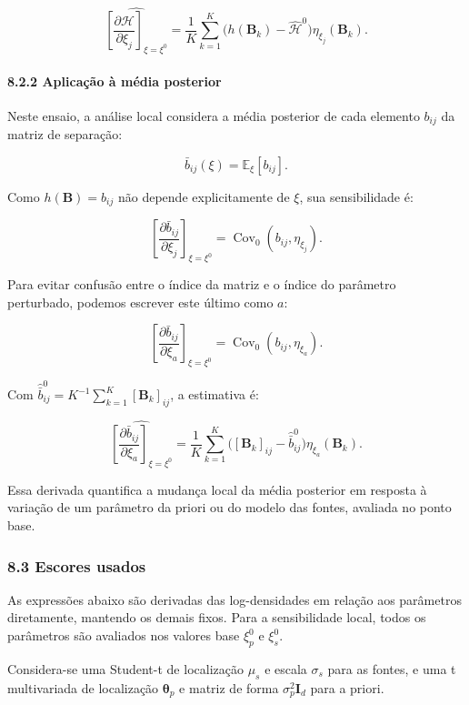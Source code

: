 \documentclass[11pt]{article}
\begin{document}
\[\widehat{
\left[
\frac{\partial \mathcal H}{\partial \xi_j}
\right]_{\xi=\xi^{0}}
}
=
\frac{1}{K}
\sum_{k=1}^{K}
\big(h(\mathbf B_k)-\hat{\mathcal H}^{0}\big)
\eta_{\xi_j}(\mathbf B_k).\]

\paragraph{8.2.2 Aplicação à média
posterior}\label{aplicauxe7uxe3o-uxe0-muxe9dia-posterior}

Neste ensaio, a análise local considera a média posterior de cada
elemento \(b_{ij}\) da matriz de separação:

\[\bar b_{ij}(\xi)=\mathbb E_{\xi}[b_{ij}].\]

Como \(h(\mathbf B)=b_{ij}\) não depende explicitamente de \(\xi\), sua
sensibilidade é:

\[\left[
\frac{\partial \bar b_{ij}}{\partial \xi_j}
\right]_{\xi=\xi^{0}}
=
\operatorname{Cov}_{0}(b_{ij},\eta_{\xi_j}).\]

Para evitar confusão entre o índice da matriz e o índice do parâmetro
perturbado, podemos escrever este último como \(a\):

\[\left[
\frac{\partial \bar b_{ij}}{\partial \xi_a}
\right]_{\xi=\xi^{0}}
=
\operatorname{Cov}_{0}(b_{ij},\eta_{\xi_a}).\]

Com \(\hat{\bar b}_{ij}^{0}=K^{-1}\sum_{k=1}^{K}[\mathbf B_k]_{ij}\), a
estimativa é:

\[\widehat{
\left[
\frac{\partial \bar b_{ij}}{\partial \xi_a}
\right]_{\xi=\xi^{0}}
}
=
\frac{1}{K}
\sum_{k=1}^{K}
\big([\mathbf B_k]_{ij}-\hat{\bar b}_{ij}^{0}\big)
\eta_{\xi_a}(\mathbf B_k).\]

Essa derivada quantifica a mudança local da média posterior em resposta
à variação de um parâmetro da priori ou do modelo das fontes, avaliada
no ponto base.

\subsubsection{8.3 Escores usados}\label{escores-usados}

As expressões abaixo são derivadas das log-densidades em relação aos
parâmetros diretamente, mantendo os demais fixos. Para a sensibilidade
local, todos os parâmetros são avaliados nos valores base \(\xi_p^{0}\)
e \(\xi_s^{0}\).

Considera-se uma Student-t de localização \(\mu_s\) e escala
\(\sigma_s\) para as fontes, e uma t multivariada de localização
\(\boldsymbol\theta_p\) e matriz de forma \(\sigma_p^2\mathbf I_d\) para
a priori.
\end{document}
